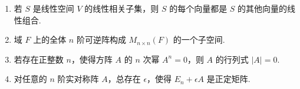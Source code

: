 \begin{enumerate}
    \begin{enumerate}[label=(\arabic*)]
        \item 若 $S$ 是线性空间 $V$ 的线性相关子集，则 $S$ 的每个向量都是 $S$ 的其他向量的线性组合.
        \item 域 $F$ 上的全体 $n$ 阶可逆阵构成 $M_{n\times n}(F)$ 的一个子空间.
        \item 若存在正整数 $n$，使得方阵 $A$ 的 $n$ 次幂 $A^n=0$，则 $A$ 的行列式 $\lvert A \rvert = 0.$
        \item 对任意的 $n$ 阶实对称阵 $A$，总存在 $\epsilon$，使得 $E_n+\epsilon A$ 是正定矩阵.
    \end{enumerate}
\end{enumerate}

\clearpage

